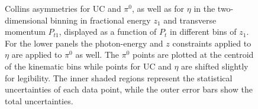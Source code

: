 \begin{figure}[H]
  \centering     
\caption[Collins asymmetries for UC and $\pi^0$, as well as for $\eta$ in the two-dimensional binning in  $z_{1}$ and \(P_{t1}\)]{Collins asymmetries for UC and $\pi^0$, as well as for $\eta$ in the two-dimensional binning in fractional energy $z_{1}$ and transverse momentum \(P_{t1}\), displayed as a function of $P_t$ in different bins of \(z_{1}\).
For the lower panels the photon-energy and $z$ constraints applied to $\eta$ are applied to $\pi^0$ as well. 
The $\pi^0$ points are plotted at the centroid of the kinematic bins while points for UC and $\eta$ are shifted slightly for legibility. 
The inner shaded regions represent the statistical uncertainties of each data point, while the outer error bars show the total uncertainties.}
\label{fig:finalasymmetry5}
\end{figure}


